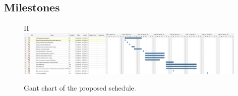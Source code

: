 \subsection{Milestones}

\begin{figure}{H}
    \centering
    \captionsetup{justification=centering, margin = 0.5cm}
    \includegraphics[scale=0.3]{images/Gant} 
    \caption{Gant chart of the proposed schedule.}
    \label{fig:gant}
\end{figure}



